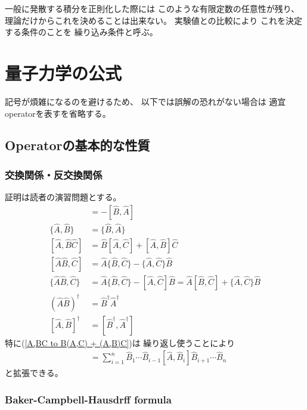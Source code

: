 一般に発散する積分を正則化した際には
このような有限定数の任意性が残り、
理論だけからこれを決めることは出来ない。
実験値との比較により
これを決定する条件のことを
繰り込み条件と呼ぶ。

\newpage
\section{量子力学の公式}

記号が煩雑になるのを避けるため、
以下では誤解の恐れがない場合は
適宜operatorを表す$\hat{}$を省略する。

\subsection{Operatorの基本的な性質}

\subsubsection{交換関係・反交換関係}

証明は読者の演習問題とする。
\begin{align}
    [\hat{A}, \hat{B}] &= - [\hat{B}, \hat{A}]
\\
    \{\hat{A}, \hat{B}\} &= \{\hat{B}, \hat{A}\}
\\
    [\hat{A}, \hat{B}\hat{C}]
   &=
   \hat{B}[\hat{A}, \hat{C}]
+
    [\hat{A}, \hat{B}] \hat{C}
\label{A,BC to B(A,C) + (A,B)C}
\\
    [\hat{A}\hat{B}, \hat{C}]
   &=
   \hat{A}\{\hat{B}, \hat{C}\}
-
    \{\hat{A}, \hat{C}\} \hat{B}
\\
    \{ \hat{A}\hat{B}, \hat{C} \}
   &=
   \hat{A}\{\hat{B}, \hat{C}\}
-
    [ \hat{A}, \hat{C} ] \hat{B}
=
   \hat{A} [ \hat{B}, \hat{C} ]
+
    \{\hat{A}, \hat{C}\} \hat{B}
\\
    \left(\hat{A}\hat{B}\right)^\dagger
    &=
    \hat{B}^\dagger\hat{A}^\dagger
\\
    [\hat{A}, \hat{B}]^\dagger
    &=
    [\hat{B}^\dagger, \hat{A}^\dagger]
\end{align}
特に(\ref{A,BC to B(A,C) + (A,B)C})は
繰り返し使うことにより
\begin{align}
    [\hat{A}, \hat{B}_1\hat{B}_2\cdots\hat{B}_n]
   &=
   \sum_{i=1}^n
   \hat{B}_1\cdots\hat{B}_{i-1}
   [\hat{A}, \hat{B}_i]
   \hat{B}_{i+1}\cdots\hat{B}_n
\end{align}
と拡張できる。

\subsubsection{Baker-Campbell-Hausdrff formula}

